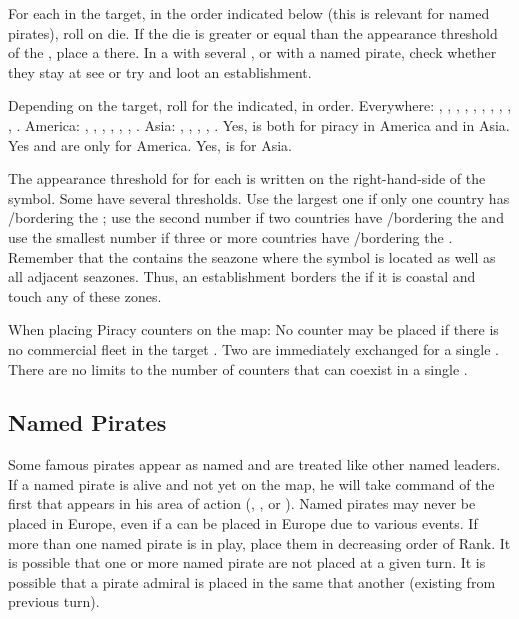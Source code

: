 \aparag For each \STZ in the target, in the order indicated below (this
is relevant for named pirates), roll on die. If the die is greater or
equal than the appearance threshold of the \STZ, place a
\PIRATE\facemoins there.
\bparag In a \STZ with several \PIRATE\faceplus, or with a named pirate,
check whether they stay at see or try and loot an establishment.

 Depending on the target, roll for the \STZ
indicated, in order.
\bparag Everywhere: , , ,
, , , , ,
, , .
\bparag America: , , ,
, , , .
\bparag Asia: , , , ,
.
\bparag Yes,  is both for piracy in America and in
Asia. Yes  and  are only for America. Yes,
 is for Asia.

\label{chEvents:Piracy Level}
The appearance threshold for \PIRATE for each \ROTW \STZ is written on
the right-hand-side of the \STZ symbol.
\bparag Some \STZ have several thresholds. Use the largest one if only
one country has \COL/\TP bordering the \STZ; use the second number if
two countries have \COL/\TP bordering the \STZ and use the smallest
number if three or more countries have \COL/\TP bordering the \STZ.
\bparag Remember that the \STZ contains the seazone where the symbol is
located as well as all adjacent seazones. Thus, an establishment borders
the \STZ if it is coastal and touch any of these zones.

 \label{chEvents:PiracyPlacement} When placing
Piracy counters on the map:
\bparag No \PIRATE counter may be placed if there is no commercial fleet
in the target \STZ.
\bparag Two \PIRATE\facemoins are immediately exchanged for a single
\PIRATE\faceplus.
\bparag There are no limits to the number of \corsaire counters that can
coexist in a single \STZ.



\subsection{Named Pirates}\label{chEvents:Named Pirates}

\aparag Some famous pirates appear as named  \LeaderA and
are treated like other named leaders.
\bparag If a named pirate is alive and not yet on the map, he will take
command of the first \PIRATE that appears in his area of action
(, , or \ROTW).
\bparag Named pirates may never be placed in Europe, even if a \PIRATE
can be placed in Europe due to various events.
\bparag If more than one named pirate is in play, place them in
decreasing order of Rank. It is possible that one or more named pirate
are not placed at a given turn. It is possible that a pirate admiral is
placed in the same \STZ that another (existing from previous turn).

